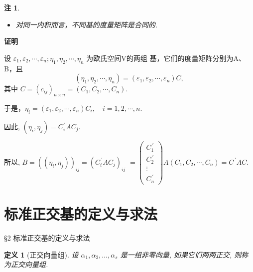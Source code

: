 \documentclass[13pt]{beamer}
\newtheorem*{defi}{定义}
\newtheorem*{rem}{注}
\def\pf{{\bf 证明~~ }}
\begin{document}
\begin{frame}
\begin{rem}
	\begin{itemize}
	\item 对同一内积而言，不同基的度量矩阵是合同的. 
	\end{itemize}
\end{rem}
\pf
\small{ 设 $\varepsilon_{1}, \varepsilon_{2}, \cdots, \varepsilon_{n} ; \eta_{1}, \eta_{2}, \cdots, \eta_{n}$ 为欧氏空间V的两组
基，它们的度量矩阵分别为A、B，且
$$\left(\eta_{1}, \eta_{2}, \cdots, \eta_{n}\right)=\left(\varepsilon_{1}, \varepsilon_{2}, \cdots, \varepsilon_{n}\right) C,$$
其中 $C=\left(c_{i j}\right)_{n \times n}=\left(C_{1}, C_{2}, \cdots, C_{n}\right)$.

于是，$\eta_{i}=\left(\varepsilon_{1}, \varepsilon_{2}, \cdots, \varepsilon_{n}\right) C_i,\quad   i=1,2, \cdots, n$.


因此, 
$\left(\eta_{i}, \eta_{j}\right) 
=C_{i}^{\, \prime} A C_{j}$.

所以, $B=\left(\left(\eta_{i}, \eta_{j}\right)\right)_{ij}=\left(C_{i}^{\, \prime} A C_{j}\right)_{ij}$
$=\left(\begin{array}{c}C_{1}^{\, \prime} \\ C_{2}^{\, \prime} \\ \vdots \\ C_{n}^{\, \prime}\end{array}\right) A\left(C_{1}, C_{2}, \cdots, C_{n}\right)=C^{\, \prime} A C$.
}
\end{frame}

\section{标准正交基的定义与求法}
\begin{frame}{\S 2 标准正交基的定义与求法}

\begin{defi}[正交向量组]
设 $\alpha_{1}, \alpha_{2}, \ldots, \alpha_{s}$ 是一组非零向量, 如果它们两两正交, 则称为\alert{正交向量组}.
\end{defi}
\end{frame}
\end{document}
